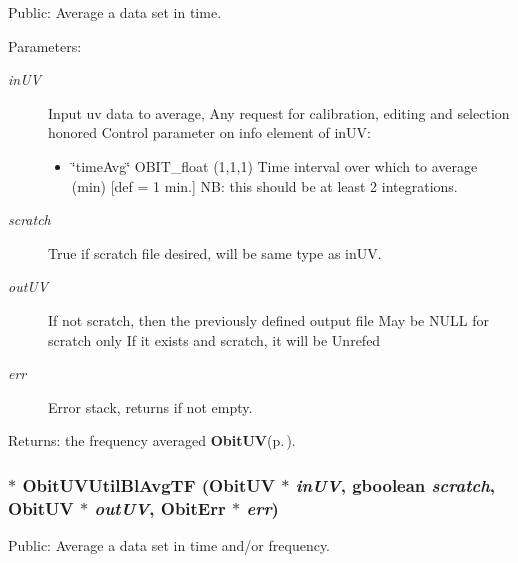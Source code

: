 Public: Average a data set in time. 

\begin{Desc}
\item[Parameters:]
\begin{description}
\item[{\em in\-UV}]Input uv data to average, Any request for calibration, editing and selection honored Control parameter on info element of in\-UV: \begin{itemize}
\item \char`\"{}time\-Avg\char`\"{} OBIT\_\-float (1,1,1) Time interval over which to average (min) [def = 1 min.] NB: this should be at least 2 integrations.\end{itemize}
\item[{\em scratch}]True if scratch file desired, will be same type as in\-UV. \item[{\em out\-UV}]If not scratch, then the previously defined output file May be NULL for scratch only If it exists and scratch, it will be Unrefed \item[{\em err}]Error stack, returns if not empty. \end{description}
\end{Desc}
\begin{Desc}
\item[Returns:]the frequency averaged {\bf Obit\-UV}{\rm (p.\,\pageref{structObitUV})}. \end{Desc}
\subsubsection{$\ast$ Obit\-UVUtil\-Bl\-Avg\-TF ({\bf Obit\-UV} $\ast$ {\em in\-UV}, gboolean {\em scratch}, {\bf Obit\-UV} $\ast$ {\em out\-UV}, {\bf Obit\-Err} $\ast$ {\em err})}\label{ObitUVUtil_8h_a8}


Public: Average a data set in time and/or frequency. 

